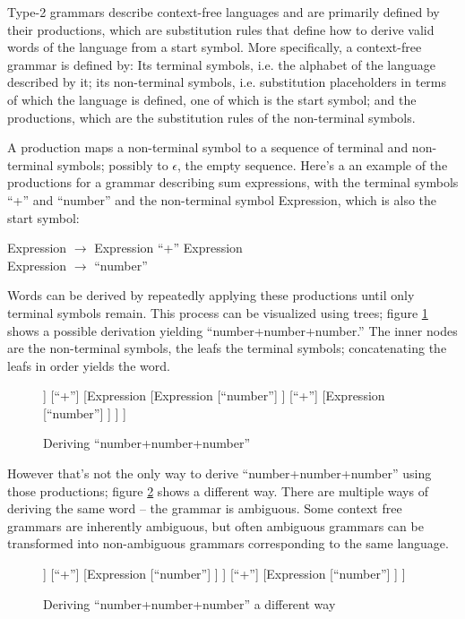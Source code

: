 			Type-2 grammars describe context-free languages and are primarily defined by their productions, which are substitution rules that define how to derive valid words of the language from a start symbol. More specifically, a context-free grammar is defined by: Its terminal symbols, i.e. the alphabet of the language described by it; its non-terminal symbols, i.e. substitution placeholders in terms of which the language is defined, one of which is the start symbol; and the productions, which are the substitution rules of the non-terminal symbols.
			
			A production maps a non-terminal symbol to a sequence of terminal and non-terminal symbols; possibly to $\epsilon$, the empty sequence. Here's a an example of the productions for a grammar describing sum expressions, with the terminal symbols ``+'' and ``number'' and the non-terminal symbol Expression, which is also the start symbol:
			
			Expression $\rightarrow$ Expression ``+'' Expression\\
			Expression $\rightarrow$ ``number''
			
			Words can be derived by repeatedly applying these productions until only terminal symbols remain. This process can be visualized using trees; figure \ref{fig:derivation_tree_exp_1} shows a possible derivation yielding ``number+number+number.'' The inner nodes are the non-terminal symbols, the leafs the terminal symbols; concatenating the leafs in order yields the word.
			
			\begin{figure}
			\centering
			\begin{forest}
			[Expression
				[Expression
					[``number'']
				]
				[``+'']
				[Expression
					[Expression
						[``number'']
					]
					[``+'']
					[Expression
						[``number'']
					]
				]
			]
			\end{forest}
			\caption{Deriving ``number+number+number''}
			\label{fig:derivation_tree_exp_1}
			\end{figure}
			
			However that's not the only way to derive ``number+number+number'' using those productions; figure \ref{fig:derivation_tree_exp_2} shows a different way. There are multiple ways of deriving the same word -- the grammar is ambiguous. Some context free grammars are inherently ambiguous, but often ambiguous grammars can be transformed into non-ambiguous grammars corresponding to the same language.
			
			\begin{figure}
			\centering
			\begin{forest}
			[Expression
				[Expression
					[Expression
						[``number'']
					]
					[``+'']
					[Expression
						[``number'']
					]
				]
				[``+'']
				[Expression
					[``number'']
				]
			]
			\end{forest}
			\caption{Deriving ``number+number+number'' a different way}
			\label{fig:derivation_tree_exp_2}
			\end{figure}
			
